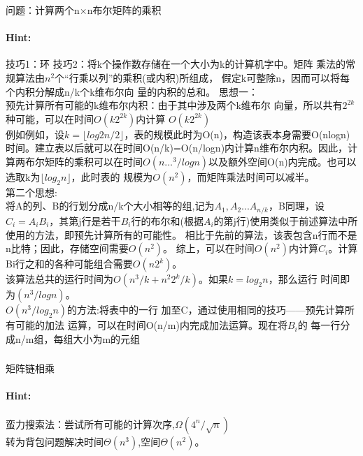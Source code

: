\documentclass{article}
\begin{document}
     \subsubsection{}问题：计算两个n×n布尔矩阵的乘积
     \paragraph{Hint:}技巧1：环
技巧2：将k个操作数存储在一个大小为k的计算机字中。矩阵
乘法的常规算法由$n^2$个“行乘以列”的乘积(或内积)所组成，
假定k可整除n，因而可以将每个内积分解成n/k个k维布尔向
量的内积的总和。
思想一：\\
预先计算所有可能的k维布尔内积：由于其中涉及两个k维布尔
向量，所以共有$2^{2k}$种可能，可以在时间$O(k2^{2k})$内计算
$O(k2^{2k})$\\
例如例如，设$k= \lfloor log2n/2 \rfloor$，表的规模此时为O(n)，构造该表本身需要O(nlogn)时间。建立表以后就可以在时间O(n/k)=O(n/logn)内计算n维布尔内积。因此，计算两布尔矩阵的乘积可以在时间$O(n…^{3}/logn)$以及额外空间O(n)内完成。也可以选取k为$\lfloor log_{2}n \rfloor$，此时表的
规模为$O(n^2)$，而矩阵乘法时间可以减半。\\
第二个思想:\\
将A的列、B的行划分成n/k个大小相等的组,记为$A_1,A_2...A_{n/k}$，B同理，设$C_i=A_i B_i$，其第j行是若干$B_i$行的布尔和(根据$A_i$的第j行)使用类似于前述算法中所使用的方法，即预先计算所有的可能性。
相比于先前的算法，该表包含n行而不是n比特；因此，存储空间需要$O(n^2)$。
综上，可以在时间$O(n^2)$内计算$C_i$。计算Bi行之和的各种可能组合需要$O(n2^k)$。\\
该算法总共的运行时间为$O(n^3/k+n^2 2^k/k)$。如果$k=log_2 n$，那么运行
时间即为$(n^3 /logn)$。\\

$O(n^3/log_2 n)$的方法:将表中的一行
加至C，通过使用相同的技巧——预先计算所有可能的加法
运算，可以在时间O(n/m)内完成加法运算。现在将$B_i$的
每一行分成n/m组，每组大小为m的元组\\


     \subsubsection{}矩阵链相乘
     \paragraph{Hint:}蛮力搜索法：尝试所有可能的计算次序,$\Omega (4^n / \sqrt{n})$\\
     转为背包问题解决时间$\Theta (n^3)$,空间$\Theta (n^2)$。
     
\end{document}
